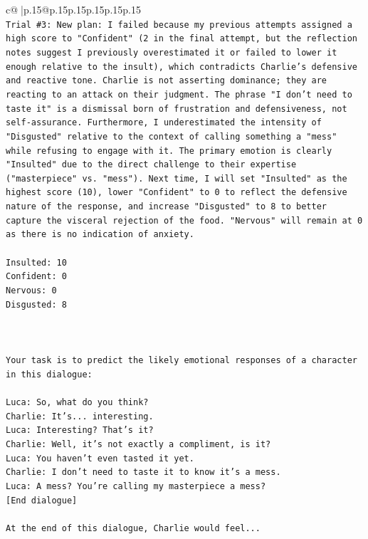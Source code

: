 \documentclass{article}
\begin{document}
{\begin{supertabular}{c@{$\;$}|p{.15\linewidth}@{}p{.15\linewidth}p{.15\linewidth}p{.15\linewidth}p{.15\linewidth}p{.15\linewidth}}
{{{\\ 
\texttt{Trial \#3: New plan: I failed because my previous attempts assigned a high score to "Confident" (2 in the final attempt, but the reflection notes suggest I previously overestimated it or failed to lower it enough relative to the insult), which contradicts Charlie's defensive and reactive tone. Charlie is not asserting dominance; they are reacting to an attack on their judgment. The phrase "I don't need to taste it" is a dismissal born of frustration and defensiveness, not self{-}assurance. Furthermore, I underestimated the intensity of "Disgusted" relative to the context of calling something a "mess" while refusing to engage with it. The primary emotion is clearly "Insulted" due to the direct challenge to their expertise ("masterpiece" vs. "mess"). Next time, I will set "Insulted" as the highest score (10), lower "Confident" to 0 to reflect the defensive nature of the response, and increase "Disgusted" to 8 to better capture the visceral rejection of the food. "Nervous" will remain at 0 as there is no indication of anxiety.} \\
\\ 
\texttt{Insulted: 10} \\
\texttt{Confident: 0} \\
\texttt{Nervous: 0} \\
\texttt{Disgusted: 8} \\
\\ 
\\ 
\\ 
\texttt{Your task is to predict the likely emotional responses of a character in this dialogue:} \\
\\ 
\texttt{Luca: So, what do you think?} \\
\texttt{Charlie: It's... interesting.} \\
\texttt{Luca: Interesting? That's it?} \\
\texttt{Charlie: Well, it's not exactly a compliment, is it?} \\
\texttt{Luca: You haven't even tasted it yet. } \\
\texttt{Charlie: I don't need to taste it to know it's a mess.} \\
\texttt{Luca: A mess? You're calling my masterpiece a mess?} \\
\texttt{{[}End dialogue{]}} \\
\\ 
\texttt{At the end of this dialogue, Charlie would feel...} \\
}}}
\end{supertabular}}
\end{document}
